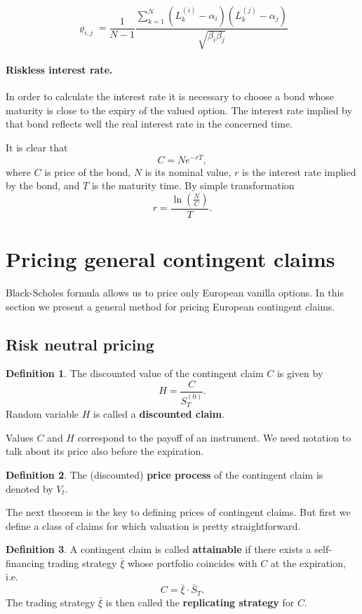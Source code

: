 \documentclass[a4paper,11pt, twoside]{book}
\theoremstyle{definition}
\newtheorem{mydef}{Definition}[chapter]
\theoremstyle{remark}
\def\Sa{\bar{S}}
\def\xia{\bar{\xi}}
\begin{document}
\[ \varrho_{i,j} = \frac{1}{N-1} \frac{\sum\limits_{k=1}^N(L^{(i)}_k - \alpha_i)(L^{(j)}_k - \alpha_j)}{\sqrt{\beta_i \beta_j}} \]

\paragraph{Riskless interest rate.}
In order to calculate the interest rate it is necessary to choose a bond whose maturity is close to the expiry of the valued option. The interest rate implied by that bond reflects well the real interest rate in the concerned time.

It is clear that
\[ C = Ne^{-rT}, \]
where $C$ is price of the bond, $N$ is its nominal value, $r$ is the interest rate implied by the bond, and $T$ is the maturity time. By simple transformation
\begin{equation*}
r = \dfrac{\ln(\frac{N}{C})}{T}.
\end{equation*}

\section{Pricing general contingent claims}
\label{sec:risk-neutral}
Black-Scholes formula allows us to price only European vanilla options. In this section we present a general method for pricing European contingent claims. 

\subsection{Risk neutral pricing}
\begin{mydef}
 The discounted value of the contingent claim $C$ is given by
 \begin{equation*}
  H = \frac{C}{S^{(0)}_T}.
 \end{equation*}
 Random variable $H$ is called a \textbf{discounted claim}.
\end{mydef}

Values $C$ and $H$ correspond to the payoff of an instrument. We need notation to talk about its price also before the expiration.
\begin{mydef}
 The (discounted) \textbf{price process} of the contingent claim is denoted by $V_t$. 
\end{mydef}

The next theorem is the key to defining prices of contingent claims. But first we define a class of claims for which valuation is pretty straightforward. 
\begin{mydef}
 A contingent claim is called \textbf{attainable} if there exists a self-financing trading strategy $\xia$ whose portfolio coincides with $C$ at the expiration, i.e.
 \[ C = \xia \cdot \Sa_T. \]
 The trading strategy $\xia$ is then called the \textbf{replicating strategy} for $C$.
\end{mydef}
\end{document}

